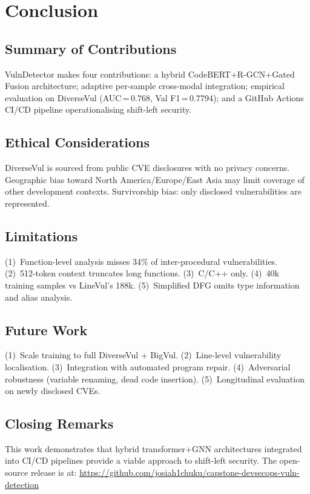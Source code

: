 \documentclass[12pt, letterpaper]{article}
\begin{document}
\section{Conclusion}

\subsection{Summary of Contributions}

VulnDetector makes four contributions: a hybrid CodeBERT+R-GCN+Gated Fusion
architecture; adaptive per-sample cross-modal integration; empirical
evaluation on DiverseVul (AUC\,=\,0.768, Val F1\,=\,0.7794); and a GitHub
Actions CI/CD pipeline operationalising shift-left security.

\subsection{Ethical Considerations}

DiverseVul is sourced from public CVE disclosures with no privacy concerns.
Geographic bias toward North America/Europe/East Asia may limit coverage of
other development contexts. Survivorship bias: only disclosed vulnerabilities
are represented.

\subsection{Limitations}

(1)~Function-level analysis misses 34\% of inter-procedural vulnerabilities.
(2)~512-token context truncates long functions.
(3)~C/C++ only.
(4)~40k training samples vs LineVul's 188k.
(5)~Simplified DFG omits type information and alias analysis.

\subsection{Future Work}

(1)~Scale training to full DiverseVul + BigVul.
(2)~Line-level vulnerability localisation.
(3)~Integration with automated program repair.
(4)~Adversarial robustness (variable renaming, dead code insertion).
(5)~Longitudinal evaluation on newly disclosed CVEs.

\subsection{Closing Remarks}

This work demonstrates that hybrid transformer+GNN architectures integrated
into CI/CD pipelines provide a viable approach to shift-left security. The
open-source release is at:
\url{https://github.com/josiah1chuku/capstone-devsecops-vuln-detection}
\end{document}
